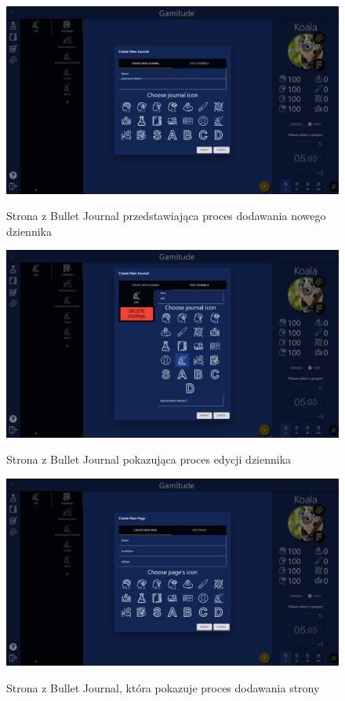 \documentclass[a4paper,11pt]{report}
\begin{document}
\begin{figure}[H]
	\centering
	\includegraphics[scale=0.3]{prezentacja/Bullet_Journal_add}\\
	\caption{Strona z Bullet Journal przedstawiająca proces dodawania nowego dziennika}
	\label{fig:Bullet_Journal_add}
\end{figure}
\begin{figure}[H]
	\centering
	\includegraphics[scale=0.3]{prezentacja/Journal_edit}\\
	\caption{Strona z Bullet Journal pokazująca proces edycji dziennika}
	\label{fig:Journal_edit}
\end{figure}
\begin{figure}[H]
	\centering
	\includegraphics[scale=0.3]{prezentacja/Page_add}\\
	\caption{Strona z Bullet Journal, która pokazuje proces dodawania strony}
	\label{fig:Page_add}
\end{figure}
\end{document}
